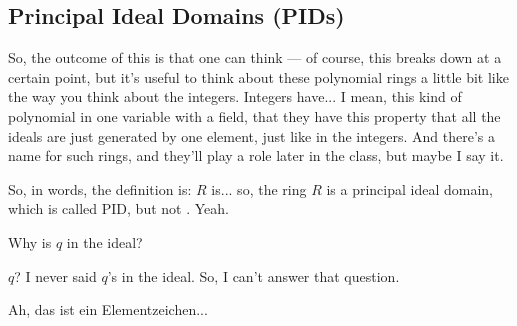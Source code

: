 \begin{proofWrapper}

\end{proofWrapper}

\subsection{Principal Ideal Domains (PIDs)}

\begin{speech}[00:38:47 - 00:40:01]
So, the outcome of this is that one can think --- of course, this breaks down at a certain point, but it's useful to think about these polynomial rings a little bit like the way you think about the integers. Integers have... I mean, this kind of polynomial in one variable with a field, that they have this property that all the ideals are just generated by one element, just like in the integers. And there's a name for such rings, and they'll play a role later in the class, but maybe I say it.

So, in words, the definition is: $R$ is... so, the ring $R$ is a principal ideal domain, which is called PID, but not . Yeah.
\end{speech}

\begin{student}
Why is $q$ in the ideal?
\end{student}

\begin{speech}[00:40:04 - 00:40:09]
$q$? I never said $q$'s in the ideal. So, I can't answer that question.
\end{speech}

\begin{student}
Ah, das ist ein Elementzeichen... 
\end{student}


